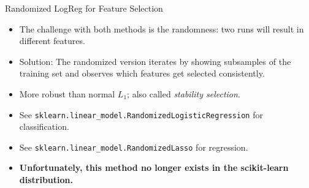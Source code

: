 \documentclass[10pt, aspectratio=169]{beamer} %
\begin{document}
\begin{frame}[fragile]{Randomized LogReg for Feature Selection}
\begin{itemize}
\item The challenge with both methods is the randomness: two runs will result in different features.
\item Solution: The randomized version iterates by showing subsamples of the training set and observes
which features get selected consistently.
\item More robust than normal $L_1$; also called \emph{stability selection}.
\item {See \texttt{sklearn.linear}}\verb+_+{\texttt{model.RandomizedLogisticRegression} for classification.}
\item {See \texttt{sklearn.linear}}\verb+_+{\texttt{model.RandomizedLasso} for regression.}
\item \textbf{Unfortunately, this method no longer exists in the scikit-learn distribution.}
\end{itemize}
\end{frame}
\end{document}
